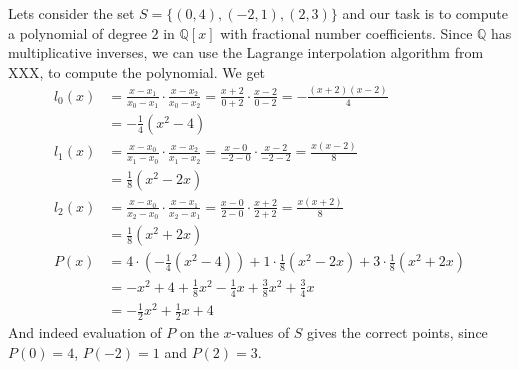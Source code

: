 \begin{example} Lets consider the set $S=\{(0,4),(-2,1),(2,3)\}$ and our task is to compute a polynomial of degree $2$ in $\mathbb{Q}[x]$ with fractional number coefficients. Since $\mathbb{Q}$ has multiplicative inverses, we can use the Lagrange interpolation algorithm from XXX, to compute the polynomial. We get
\begin{align*}
l_0(x) & = \frac{x-x_1}{x_0-x_1}\cdot\frac{x-x_2}{x_0-x_2}
         = \frac{x+2}{0+2}\cdot\frac{x-2}{0-2}
         =  -\frac{(x+2)(x-2)}{4}\\
       & = -\frac{1}{4}(x^2-4)\\
l_1(x) & = \frac{x-x_0}{x_1-x_0}\cdot\frac{x-x_2}{x_1-x_2}
          = \frac{x-0}{-2-0}\cdot \frac{x-2}{-2-2}
          = \frac{x(x-2)}{8}\\
       & = \frac{1}{8}(x^2-2x)\\
l_2(x) & = \frac{x-x_0}{x_2-x_0}\cdot\frac{x-x_1}{x_2-x_1}
          = \frac{x-0}{2-0}\cdot\frac{x+2}{2+2}
          = \frac{x(x+2)}{8}\\
       & = \frac{1}{8}(x^2+2x)\\
P(x)   & =  4\cdot (-\frac{1}{4}(x^2-4)) + 1\cdot \frac{1}{8}(x^2-2x) + 3\cdot \frac{1}{8}(x^2+2x)\\
       & = -x^2+4 + \frac{1}{8}x^2-\frac{1}{4} x + \frac{3}{8}x^2+\frac{3}{4} x \\
       & = -\frac{1}{2} x^2 +\frac{1}{2} x + 4        
\end{align*}
And indeed evaluation of $P$ on the $x$-values of $S$ gives the correct points, since $P(0)=4$, $P(-2)=1$ and $P(2)=3$.
\end{example}
